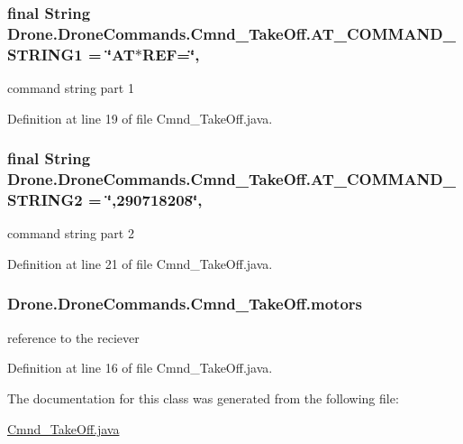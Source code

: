 \subsubsection[{A\+T\+\_\+\+C\+O\+M\+M\+A\+N\+D\+\_\+\+S\+T\+R\+I\+N\+G1}]{\setlength{\rightskip}{0pt plus 5cm}final String Drone.\+Drone\+Commands.\+Cmnd\+\_\+\+Take\+Off.\+A\+T\+\_\+\+C\+O\+M\+M\+A\+N\+D\+\_\+\+S\+T\+R\+I\+N\+G1 = \char`\"{}A\+T$\ast$R\+E\+F=\char`\"{}\hspace{0.3cm}{\ttfamily [static]}, {\ttfamily [private]}}\label{class_drone_1_1_drone_commands_1_1_cmnd___take_off_a81d9c1d947903cb7033f02d0fc50b29a}
command string part 1 

Definition at line 19 of file Cmnd\+\_\+\+Take\+Off.\+java.

\hypertarget{class_drone_1_1_drone_commands_1_1_cmnd___take_off_a6a0828ac3a68db7162e571a9de31d14a}{}
\subsubsection[{A\+T\+\_\+\+C\+O\+M\+M\+A\+N\+D\+\_\+\+S\+T\+R\+I\+N\+G2}]{\setlength{\rightskip}{0pt plus 5cm}final String Drone.\+Drone\+Commands.\+Cmnd\+\_\+\+Take\+Off.\+A\+T\+\_\+\+C\+O\+M\+M\+A\+N\+D\+\_\+\+S\+T\+R\+I\+N\+G2 = \char`\"{},290718208\char`\"{}\hspace{0.3cm}{\ttfamily [static]}, {\ttfamily [private]}}\label{class_drone_1_1_drone_commands_1_1_cmnd___take_off_a6a0828ac3a68db7162e571a9de31d14a}
command string part 2 

Definition at line 21 of file Cmnd\+\_\+\+Take\+Off.\+java.

\hypertarget{class_drone_1_1_drone_commands_1_1_cmnd___take_off_a36070de41a3dc86f56df6a987050cf93}{}
\subsubsection[{motors}]{ Drone.\+Drone\+Commands.\+Cmnd\+\_\+\+Take\+Off.\+motors\hspace{0.3cm}{\ttfamily [private]}}\label{class_drone_1_1_drone_commands_1_1_cmnd___take_off_a36070de41a3dc86f56df6a987050cf93}
reference to the reciever 

Definition at line 16 of file Cmnd\+\_\+\+Take\+Off.\+java.



The documentation for this class was generated from the following file\+:\begin{DoxyCompactItemize}
\item 
\hyperlink{_cmnd___take_off_8java}{Cmnd\+\_\+\+Take\+Off.\+java}\end{DoxyCompactItemize}
